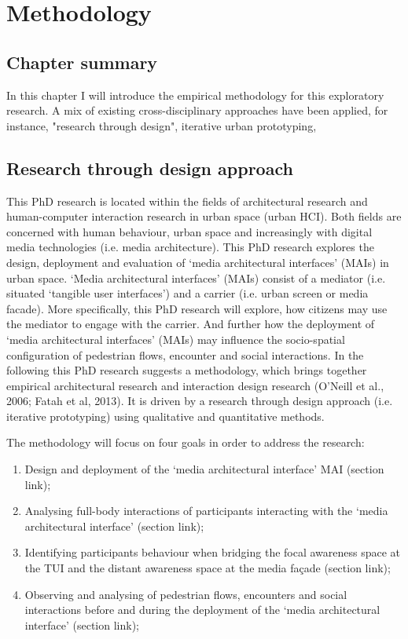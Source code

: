 \chapter{Methodology}
\label{chapterlabel4}

\section*{Chapter summary}

In this chapter I will introduce the empirical methodology for this exploratory research. A mix of existing cross-disciplinary approaches have been applied, for instance, "research through design", iterative urban prototyping,   \newpage



\section{Research through design approach}

This PhD research is located within the fields of architectural research and human-computer interaction research in urban space (urban HCI). Both fields are concerned with human behaviour, urban space and increasingly with digital media technologies (i.e. media architecture). This PhD research explores the design, deployment and evaluation of ‘media architectural interfaces’ (MAIs) in urban space. ‘Media architectural interfaces’ (MAIs) consist of a mediator (i.e. situated ‘tangible user interfaces’) and a carrier (i.e. urban screen or media facade). More specifically, this PhD research will explore, how citizens may use the mediator to engage with the carrier. And further how the deployment of ‘media architectural interfaces’ (MAIs) may influence the socio-spatial configuration of pedestrian flows, encounter and social interactions.
In the following this PhD research suggests a methodology, which brings together empirical architectural research and interaction design research (O’Neill et al., 2006; Fatah et al, 2013). It is driven by a research through design approach (i.e. iterative prototyping) using qualitative and quantitative methods.

The methodology will focus on four goals in order to address the research: 
\begin{enumerate}
\setcounter{enumi}{0}
\item Design and deployment of the ‘media architectural interface’ MAI (section link);
\item Analysing full-body interactions of participants interacting with the ‘media architectural interface’ (section link); 
\item Identifying participants behaviour when bridging the focal awareness space at the TUI and the distant awareness space at the media façade (section link);
\item Observing and analysing of pedestrian flows, encounters and social interactions before and during the deployment of the ‘media architectural interface’ (section link);
\end{enumerate}

